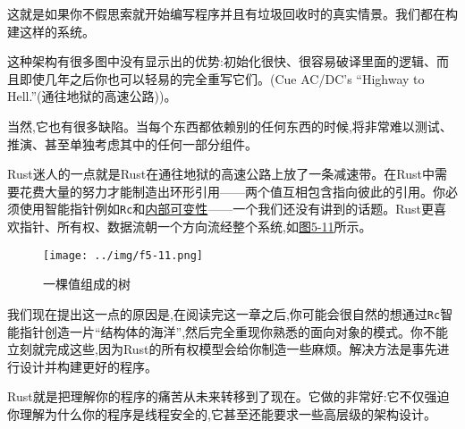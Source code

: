 这就是如果你不假思索就开始编写程序并且有垃圾回收时的真实情景。我们都在构建这样的系统。

这种架构有很多图中没有显示出的优势:初始化很快、很容易破译里面的逻辑、而且即使几年之后你也可以轻易的完全重写它们。(Cue AC/DC's “Highway to Hell.”(通往地狱的高速公路))。

当然,它也有很多缺陷。当每个东西都依赖别的任何东西的时候,将非常难以测试、推演、甚至单独考虑其中的任何一部分组件。

Rust迷人的一点就是Rust在通往地狱的高速公路上放了一条减速带。在Rust中需要花费大量的努力才能制造出环形引用——两个值互相包含指向彼此的引用。你必须使用智能指针例如\texttt{Rc}和\hyperref[intermut]{内部可变性}——一个我们还没有讲到的话题。Rust更喜欢指针、所有权、数据流朝一个方向流经整个系统,如\hyperref[f5-11]{图5-11}所示。

\begin{figure}[htbp]
    \centering
    \texttt{[image: ../img/f5-11.png]}
    \caption{一棵值组成的树}
    \label{f5-11}
\end{figure}

我们现在提出这一点的原因是,在阅读完这一章之后,你可能会很自然的想通过\texttt{Rc}智能指针创造一片“结构体的海洋”,然后完全重现你熟悉的面向对象的模式。你不能立刻就完成这些,因为Rust的所有权模型会给你制造一些麻烦。解决方法是事先进行设计并构建更好的程序。

Rust就是把理解你的程序的痛苦从未来转移到了现在。它做的非常好:它不仅强迫你理解为什么你的程序是线程安全的,它甚至还能要求一些高层级的架构设计。
